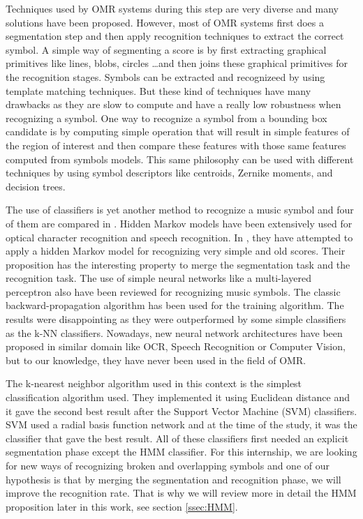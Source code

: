\documentclass[11pt]{sdm}
\begin{document}
Techniques used by OMR systems during this step are very diverse and many solutions have been proposed.
However, most of OMR systems first does a segmentation step and then apply recognition techniques to extract the correct symbol.
A simple way of segmenting a score is by first extracting graphical primitives like lines, blobs, circles \ldots and then joins these graphical primitives for the recognition stages.
Symbols can be extracted and recognizeed by using template matching techniques.
But these kind of techniques have many drawbacks as they are slow to compute and have a really low robustness when recognizing a symbol.
One way to recognize a symbol from a bounding box candidate is by computing simple operation that will result in simple features of the region of interest and then compare these features with those same features computed from symbols models.
This same philosophy can be used with different techniques by using symbol descriptors like centroids, Zernike moments, and decision trees.

The use of classifiers is yet another method to recognize a music symbol and four of them are compared in \cite{rebelo_optical_2009}.
Hidden Markov models have been extensively used for optical character recognition and speech recognition.
In \cite{pugin_optical_2006}, they have attempted to apply a hidden Markov model for recognizing very simple and old scores.
Their proposition has the interesting property to merge the segmentation task and the recognition task.
The use of simple neural networks like a multi-layered perceptron also have been reviewed for recognizing music symbols.
The classic backward-propagation algorithm has been used for the training algorithm.
The results were disappointing as they were outperformed by some simple classifiers as the k-NN classifiers.
Nowadays, new neural network architectures have been proposed in similar domain like OCR, Speech Recognition or Computer Vision, but to our knowledge, they have never been used in the field of OMR.

The k-nearest neighbor algorithm used in this context is the simplest classification algorithm used.
They implemented it using Euclidean distance and it gave the second best result after the Support Vector Machine (SVM) classifiers.
SVM used a radial basis function network and at the time of the study, it was the classifier that gave the best result.
All of these classifiers first needed an explicit segmentation phase except the HMM classifier.
For this internship, we are looking for new ways of recognizing broken and overlapping symbols and one of our hypothesis is that by merging the segmentation and recognition phase, we will improve the recognition rate.
That is why we will review more in detail the HMM proposition later in this work, see section \ref{ssec:HMM}.
\end{document}
